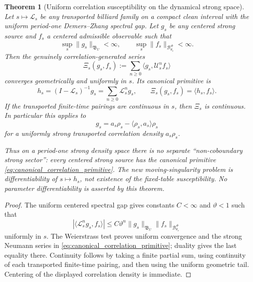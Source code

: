 \documentclass[11pt]{amsart}
\theoremstyle{compactplain}
\newtheorem{theorem}{Theorem}[section]
\theoremstyle{compactdefinition}
\theoremstyle{compactremark}
\newcommand{\Bcal}{\mathcal B}
\newcommand{\Ltransfer}{\mathscr L}
\begin{document}
\begin{theorem}[Uniform correlation susceptibility on the dynamical strong space]
\label{thm:uniform_strong_correlation_susceptibility}
Let \(s\mapsto\Ltransfer_s\) be any transported billiard family on a compact
clean interval with the uniform period-one Demers--Zhang spectral gap.  Let
\(g_s\) be any centered strong source and \(f_s\) a centered admissible
observable such that
\[
 \sup_s\|g_s\|_{\mathfrak B_U}<\infty,
 \qquad
 \sup_s\|f_s\|_{\Bcal_{\theta_s}^\#}<\infty.
\]
Then the genuinely correlation-generated series
\begin{equation}
\label{eq:uniform_strong_correlation_series}
 \Xi_s(g_s,f_s)
 :=\sum_{n\ge0}\langle g_s,\mathscr U_s^nf_s\rangle
\end{equation}
converges geometrically and uniformly in \(s\).  Its canonical primitive is
\begin{equation}
\label{eq:canonical_correlation_primitive}
 h_s=(I-\Ltransfer_s)^{-1}g_s
     =\sum_{n\ge0}\Ltransfer_s^ng_s,
 \qquad
 \Xi_s(g_s,f_s)=\langle h_s,f_s\rangle .
\end{equation}
If the transported finite-time pairings are continuous in \(s\), then
\(\Xi_s\) is continuous.  In particular this applies to
\[
 g_s=a_s\rho_s-\langle\rho_s,a_s\rangle\rho_s
\]
for a uniformly strong transported correlation density \(a_s\rho_s\).

Thus on a period-one strong density space there is no separate
``non-coboundary strong sector'': every centered strong source has the
canonical primitive \eqref{eq:canonical_correlation_primitive}.  The new
moving-singularity problem is differentiability of \(s\mapsto h_s\), not
existence of the fixed-table susceptibility.  No parameter differentiability
is asserted by this theorem.
\end{theorem}

\begin{proof}
The uniform centered spectral gap gives constants \(C<\infty\) and
\(\vartheta<1\) such that
\[
 |\langle\Ltransfer_s^ng_s,f_s\rangle|
 \le C\vartheta^n
 \|g_s\|_{\mathfrak B_U}\|f_s\|_{\Bcal_{\theta_s}^\#}
\]
uniformly in \(s\).  The Weierstrass test proves uniform convergence and the
strong Neumann series in \eqref{eq:canonical_correlation_primitive}; duality
gives the last equality there.  Continuity follows by taking a finite partial
sum, using continuity of each transported finite-time pairing, and then using
the uniform geometric tail.  Centering of the displayed correlation density
is immediate.
\end{proof}
\end{document}
